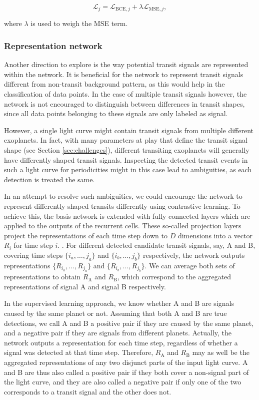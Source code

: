 \begin{equation}
    \mathcal{L}_{j} = \mathcal{L}_{\text{BCE}, j} + \lambda_{} \mathcal{L}_{\text{MSE}, j},
\end{equation}

\noindent where $\lambda$ is used to weigh the MSE term.

\subsubsection{Representation network}
\label{sec:extension_repr}

Another direction to explore is the way potential transit signals are represented within the network. It is beneficial for the network to represent transit signals different from non-transit background pattern, as this would help in the classification of data points. In the case of multiple transit signals however, the network is not encouraged to distinguish between differences in transit shapes, since all data points belonging to these signals are only labeled as signal. 

However, a single light curve might contain transit signals from multiple different exoplanets. In fact, with many parameters at play that define the transit signal shape (see Section \ref{sec:challenges}), different transiting exoplanets will generally have differently shaped transit signals. Inspecting the detected transit events in such a light curve for periodicities might in this case lead to ambiguities, as each detection is treated the same. 

In an attempt to resolve such ambiguities, we could encourage the network to represent differently shaped transits differently using contrastive learning. To achieve this, the basis network is extended with fully connected layers which are applied to the outputs of the recurrent cells. These so-called projection layers project the representations of each time step down to $D$ dimensions into a vector $R_i$ for time step $i$. . For different detected candidate transit signals, say, A and B, covering time steps $\{i_a,\dots,j_a\}$ and $\{i_b,\dots,j_b\}$ respectively, the network outputs representations $\{R_{i_a},\dots,R_{j_a}\}$ and $\{R_{i_b},\dots,R_{j_b}\}$. We can average both sets of representations to obtain $R_\text{A}$ and $R_\text{B}$, which correspond to the aggregated representations of signal A and signal B respectively. 

In the supervised learning approach, we know whether A and B are signals caused by the same planet or not. Assuming that both A and B are true detections, we call A and B a positive pair if they are caused by the same planet, and a negative pair if they are signals from different planets. Actually, the network outputs a representation for each time step, regardless of whether a signal was detected at that time step. Therefore, $R_\text{A}$ and $R_\text{B}$ may as well be the aggregated representations of any two disjunct parts of the input light curve. A and B are thus also called a positive pair if they both cover a non-signal part of the light curve, and they are also called a negative pair if only one of the two corresponds to a transit signal and the other does not.

